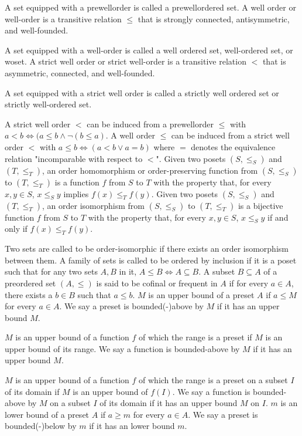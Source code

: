 \documentclass[a4paper,12pt]{article}
\begin{document}
A set equipped with a prewellorder is called a prewellordered set.
A well order or well-order is a transitive relation $\leq$ that is strongly connected, antisymmetric, and well-founded.

A set equipped with a well-order is called a well ordered set, well-ordered set, or woset.
A strict well order or strict well-order is a transitive relation $<$ that is asymmetric, connected, and well-founded.

A set equipped with a strict well order is called a strictly well ordered set or strictly well-ordered set.

A strict well order $<$ can be induced from a prewellorder $\leq$ with $a<b\iff(a\leq b\land \neg(b\leq a)$. A well order $\leq$ can be induced from a strict well order $<$ with $a\leq b\iff(a<b\lor a=b)$ where $=$ denotes the equivalence relation "incomparable with respect to $<$".
Given two posets $(S,\leq _{S})$ and $(T,\leq _{T})$, an order homomorphism or order-preserving function from $(S,\leq _{S})$ to $(T,\leq _{T})$ is a function $f$ from $S$ to $T$ with the property that, for every $x,y\in S$, $x \leq_S y$ implies $f(x)\leq _{T}f(y)$.
Given two posets $(S,\leq _{S})$ and $(T,\leq _{T})$, an order isomorphism from $(S,\leq _{S})$ to $(T,\leq _{T})$ is a bijective function $f$ from $S$ to $T$ with the property that, for every $x,y\in S$, $x \leq_S y$ if and only if $f(x)\leq _{T}f(y)$.

Two sets are called to be order-isomorphic if there exists an order isomorphism between them.
A family of sets is called to be ordered by inclusion if it is a poset such that for any two sets $A,B$ in it, $A\leq B\iff A\subseteq B$.
A subset $B\subseteq A$ of a preordered set $(A,\leq )$ is said to be cofinal or frequent in $A$ if for every $a\in A$, there exists a $b\in B$ such that $a\leq b$.
$M$ is an upper bound of a preset $A$ if $a\leq M$ for every $a\in A$. We say a preset is bounded(-)above by $M$ if it has an upper bound $M$.

$M$ is an upper bound of a function $f$ of which the range is a preset if $M$ is an upper bound of its range. We say a function is bounded-above by $M$ if it has an upper bound $M$.

$M$ is an upper bound of a function $f$ of which the range is a preset on a subset $I$ of its domain if $M$ is an upper bound of $f(I)$. We say a function is bounded-above by $M$ on a subset $I$ of its domain if it has an upper bound $M$ on $I$.
$m$ is an lower bound of a preset $A$ if $a\geq m$ for every $a\in A$. We say a preset is bounded(-)below by $m$ if it has an lower bound $m$.
\end{document}
